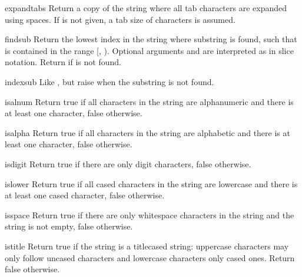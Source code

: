 \begin{methoddesc}[string]{expandtabs}{}
Return a copy of the string where all tab characters are expanded
using spaces.  If  is not given, a tab size of 
characters is assumed.
\end{methoddesc}

\begin{methoddesc}[string]{find}{sub}
Return the lowest index in the string where substring  is
found, such that  is contained in the range [,
).  Optional arguments  and  are
interpreted as in slice notation.  Return  if  is
not found.
\end{methoddesc}

\begin{methoddesc}[string]{index}{sub}
Like , but raise  when the
substring is not found.
\end{methoddesc}

\begin{methoddesc}[string]{isalnum}{}
Return true if all characters in the string are alphanumeric and there
is at least one character, false otherwise.
\end{methoddesc}

\begin{methoddesc}[string]{isalpha}{}
Return true if all characters in the string are alphabetic and there
is at least one character, false otherwise.
\end{methoddesc}

\begin{methoddesc}[string]{isdigit}{}
Return true if there are only digit characters, false otherwise.
\end{methoddesc}

\begin{methoddesc}[string]{islower}{}
Return true if all cased characters in the string are lowercase and
there is at least one cased character, false otherwise.
\end{methoddesc}

\begin{methoddesc}[string]{isspace}{}
Return true if there are only whitespace characters in the string and
the string is not empty, false otherwise.
\end{methoddesc}

\begin{methoddesc}[string]{istitle}{}
Return true if the string is a titlecased string: uppercase
characters may only follow uncased characters and lowercase characters
only cased ones.  Return false otherwise.
\end{methoddesc}

